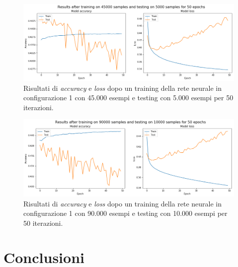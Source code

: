 \documentclass[12pt]{article}
\begin{document}
\begin{figure}[H]
\centering
\includegraphics[width=\textwidth]{images/config1_50000samples_50epochs.png}
\caption{Risultati di \textit{accuracy} e \textit{loss} dopo un training della rete neurale in configurazione 1 con 45.000 esempi e testing con 5.000 esempi per 50 iterazioni.}
\end{figure}

\begin{figure}[H]
\centering
\includegraphics[width=\textwidth]{images/config1_100000samples_50epochs.png}
\caption{Risultati di \textit{accuracy} e \textit{loss} dopo un training della rete neurale in configurazione 1 con 90.000 esempi e testing con 10.000 esempi per 50 iterazioni.}
\end{figure}




\section{Conclusioni}

\printbibliography[title={Riferimenti}]
\end{document}
